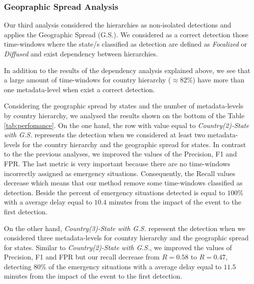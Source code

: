 \documentclass{llncs}
\begin{document}
\subsubsection{Geopraphic Spread Analysis}\label{sssec:geospreadanalysis}
Our third analysis considered the hierarchies as non-isolated detections and applies the Geographic Spread (G.S.). We considered as a correct detection those time-windows where the state/s classified as detection are defined as \textit{Focalized} or \textit{Diffused} and exist dependency between hierarchies. 

In addition to the results of the dependency analysis explained above, we see that a large amount of time-windows for country hierarchy ($\approx 82\%$) have more than one metadata-level when exist a correct detection. 



Considering the geographic spread by states and the number of metadata-levels by country hierarchy, we analysed the results shown on the bottom of the Table \ref{tab:perfomance}. On the one hand, the row with value equal to \textit{Country(2)-State with G.S.} represents the detection when we considered at least two metadata-levels for the country hierarchy and the geographic spread for states. In contrast to the the previous analyses, we improved the values of the Precision, F1 and FPR. The last metric is very important because there are no time-windows incorrectly assigned as emergency situations. Consequently, the Recall values decrease which means that our method remove some time-windows classified as detection. Beside the percent of emergency situations detected is equal to $100\%$ with a average delay equal to $10.4$ minutes from the impact of the event to the first detection.


On the other hand, \textit{Country(3)-State with G.S.} represent the detection when we considered three metadata-levels for country hierarchy and the geographic spread for states. Similar to  \textit{Country(2)-State with G.S.}, we improved the values of Precision, F1 and FPR but our recall decrease from $R = 0.58$ to $R = 0.47$, detecting  $80\%$ of the emergency situations with a average delay equal to $11.5$ minutes from the impact of the event to the first detection.
\end{document}
